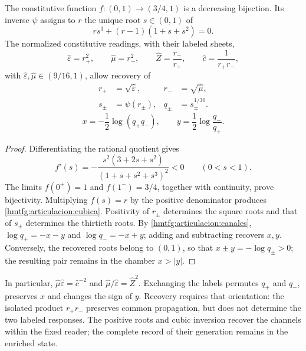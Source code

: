 \begin{proposition}
\label{hmtfg:articulacion:inversion}
The constitutive function \(f:(0,1)\to(3/4,1)\) is a decreasing
bijection. Its inverse \(\psi\) assigns to \(r\) the unique root
\(s\in(0,1)\) of
\begin{equation}
 r s^3+(r-1)(1+s+s^2)=0.
 \label{hmtfg:articulacion:cubica}
\end{equation}
The normalized constitutive readings, with their labeled sheets,
\[
 \widehat\varepsilon=r_+^2,\qquad
 \widehat\mu=r_-^2,\qquad
 \widehat Z=\frac{r_-}{r_+},\qquad
 \widehat c=\frac1{r_+r_-},
\]
with \(\widehat\varepsilon,\widehat\mu\in(9/16,1)\), allow recovery of
\begin{equation}
 \begin{aligned}
 r_+&=\sqrt{\widehat\varepsilon},&
 r_-&=\sqrt{\widehat\mu},\\
 s_\pm&=\psi(r_\pm),& q_\pm&=s_\pm^{1/30}.
 \end{aligned}
 \label{hmtfg:articulacion:recuperacion-canales}
\end{equation}
\begin{equation}
 x=-\frac12\log(q_+q_-),\qquad
 y=\frac12\log\frac{q_-}{q_+}.
 \label{hmtfg:articulacion:recuperacion-angular}
\end{equation}
\end{proposition}
\begin{proof}
Differentiating the rational quotient gives
\begin{equation}
 f'(s)=-\frac{s^2(3+2s+s^2)}{(1+s+s^2+s^3)^2}<0
 \qquad(0<s<1).
 \label{hmtfg:articulacion:monotonia}
\end{equation}
The limits \(f(0^+)=1\) and \(f(1^-)=3/4\), together with
continuity, prove bijectivity. Multiplying \(f(s)=r\) by
the positive denominator produces \eqref{hmtfg:articulacion:cubica}.
Positivity of \(r_\pm\) determines the square roots
and that of \(s_\pm\) determines the thirtieth roots.
By \eqref{hmtfg:articulacion:canales},
\(\log q_+=-x-y\) and \(\log q_-=-x+y\);
adding and subtracting recovers \(x,y\).
Conversely, the recovered roots belong to \((0,1)\),
so that \(x\pm y=-\log q_\pm>0\); the resulting pair
remains in the chamber \(x>|y|\).
\end{proof}

In particular,
\(\widehat\mu\widehat\varepsilon=\widehat c^{-2}\) and
\(\widehat\mu/\widehat\varepsilon=\widehat Z^2\).
Exchanging the labels permutes \(q_+\) and \(q_-\),
preserves \(x\) and changes the sign of \(y\). Recovery
requires that orientation: the isolated product \(r_+r_-\)
preserves common propagation, but does not determine the two labeled
responses. The positive roots and cubic inversion recover
the channels within the fixed reader; the complete record of their
generation remains in the enriched state.

